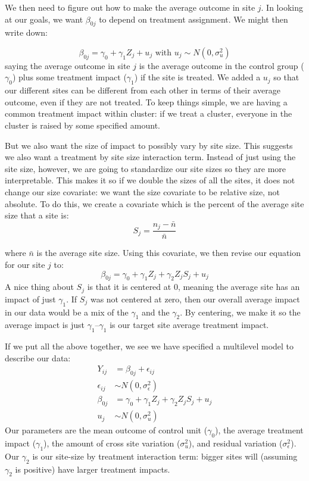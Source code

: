 \documentclass[
]{book}
\begin{document}
We then need to figure out how to make the average outcome in site \(j\).
In looking at our goals, we want \(\beta_{0j}\) to depend on treatment assignment.
We might then write down:

\[ \beta_{0j} = \gamma_0 + \gamma_1 Z_j + u_j \mbox{ with } u_j \sim N( 0, \sigma^2_u )\]
saying the average outcome in site \(j\) is the average outcome in the control group (\(\gamma_0\)) plus some treatment impact (\(\gamma_1\)) if the site is treated.
We added a \(u_j\) so that our different sites can be different from each other in terms of their average outcome, even if they are not treated.
To keep things simple, we are having a common treatment impact within cluster: if we treat a cluster, everyone in the cluster is raised by some specified amount.

But we also want the size of impact to possibly vary by site size.
This suggests we also want a treatment by site size interaction term.
Instead of just using the site size, however, we are going to standardize our site sizes so they are more interpretable.
This makes it so if we double the sizes of all the sites, it does not change our size covariate: we want the size covariate to be relative size, not absolute.
To do this, we create a covariate which is the percent of the average site size that a site is:
\[ S_j = \frac{n_j - \bar{n}}{ \bar{n} } \]

where \(\bar{n}\) is the average site size. Using this covariate, we then revise our equation for our site \(j\) to:
\[ \beta_{0j} = \gamma_{0} + \gamma_{1} Z_j + \gamma_2 Z_j S_j + u_j \]
A nice thing about \(S_j\) is that it is centered at 0, meaning the average site has an impact of just \(\gamma_1\).
If \(S_j\) was not centered at zero, then our overall average impact in our data would be a mix of the \(\gamma_1\) and the \(\gamma_2\).
By centering, we make it so the average impact is just \(\gamma_1\)--\(\gamma_1\) is our target site average treatment impact.

If we put all the above together, we see we have specified a multilevel model to describe our data:
\[
\begin{aligned}
Y_{ij} &= \beta_{0j} + \epsilon_{ij} \\
\epsilon_{ij} &\sim N( 0, \sigma^2_\epsilon ) \\
\beta_{0j} &= \gamma_{0} + \gamma_{1} Z_j + \gamma_2 Z_j S_j + u_j \\
u_j &\sim N( 0, \sigma^2_u )
\end{aligned}
\]
Our parameters are the mean outcome of control unit (\(\gamma_0\)), the average treatment impact (\(\gamma_1\)), the amount of cross site variation (\(\sigma^2_u\)), and residual variation (\(\sigma^2_\epsilon\)).
Our \(\gamma_2\) is our site-size by treatment interaction term: bigger sites will (assuming \(\gamma_2\) is positive) have larger treatment impacts.
\end{document}
